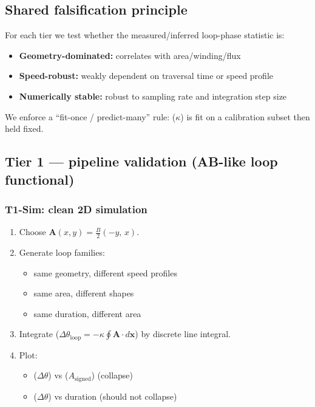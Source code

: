 ﻿\documentclass[twocolumn,aps,prd,nofootinbib]{revtex4-2}
\begin{document}
\subsection{Shared falsification principle}
For each tier we test whether the measured/inferred loop-phase statistic is:
\begin{itemize}
    \item \textbf{Geometry-dominated:} correlates with area/winding/flux
    \item \textbf{Speed-robust:} weakly dependent on traversal time or speed profile
    \item \textbf{Numerically stable:} robust to sampling rate and integration step size
\end{itemize}
We enforce a ``fit-once / predict-many'' rule: ($\kappa$) is fit on a calibration subset then held fixed.

\subsection{Tier 1 --- pipeline validation (AB-like loop functional)}
\subsubsection*{T1-Sim: clean 2D simulation}
\begin{enumerate}
    \item Choose $\mathbf{A}(x,y)=\tfrac{B}{2}(-y,\,x)$.
    \item Generate loop families:
    \begin{itemize}
        \item same geometry, different speed profiles
        \item same area, different shapes
        \item same duration, different area
    \end{itemize}
    \item Integrate ($\Delta\theta_{\mathrm{loop}} = -\kappa\oint \mathbf{A}\cdot d\mathbf{x}$) by discrete line integral.
    \item Plot:
    \begin{itemize}
        \item ($\Delta\theta$) vs ($A_{\mathrm{signed}}$) (collapse)
        \item ($\Delta\theta$) vs duration (should not collapse)
    \end{itemize}
\end{enumerate}
\end{document}

